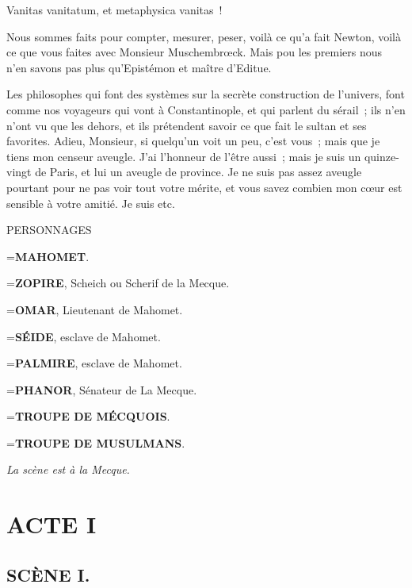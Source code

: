 \documentclass[french,twoside]{book} %
\newcommand{\castItem}[1]{{\noindent\hangindent=\parindent #1\par}}
\newcommand{\dateline}[1]{\medskip{\RaggedLeft{#1}\par}\bigskip}
\newcommand\chapteropen{} %
\newcommand\chaptercont{} %
\begin{document}
Vanitas vanitatum, et metaphysica vanitas !\par
Nous sommes faits pour compter, mesurer, peser, voilà ce qu’a fait Newton, voilà ce que vous faites avec Monsieur Muschembrœck. Mais pou les premiers nous n’en savons pas plus qu’Epistémon et maître d’Editue.\par
Les philosophes qui font des systèmes sur la secrète construction de l’univers, font comme nos voyageurs qui vont à Constantinople, et qui parlent du sérail ; ils n’en n’ont vu que les dehors, et ils prétendent savoir ce que fait le sultan et ses favorites. Adieu, Monsieur, si quelqu’un voit un peu, c’est vous ; mais que je tiens mon censeur aveugle. J’ai l’honneur de l’être aussi ; mais je suis un quinze-vingt de Paris, et lui un aveugle de province. Je ne suis pas assez aveugle pourtant pour ne pas voir tout votre mérite, et vous savez combien mon cœur est sensible à votre amitié. Je suis etc.\par

\dateline{À Ciray, le 1er juin 1741.}

\bigbreak
{\centering PERSONNAGES\par}\nopagebreak\bigskip\nopagebreak
\castItem{\textbf{MAHOMET}.}

\castItem{\textbf{ZOPIRE}, Scheich ou Scherif de la Mecque.}

\castItem{\textbf{OMAR}, Lieutenant de Mahomet.}

\castItem{\textbf{SÉIDE}, esclave de Mahomet.}

\castItem{\textbf{PALMIRE}, esclave de Mahomet.}

\castItem{\textbf{PHANOR}, Sénateur de La Mecque.}

\castItem{\textbf{TROUPE DE MÉCQUOIS}.}

\castItem{\textbf{TROUPE DE MUSULMANS}.}
\bigbreak

\textit{La scène est à la Mecque.}
\mainmatter


\chapteropen

\chapter[{ACTE I}]{ACTE I}
\renewcommand{\leftmark}{ACTE I}
\label{I}


\chaptercont

\section[{SCÈNE I.}]{SCÈNE I.}
\label{I01}
\end{document}
